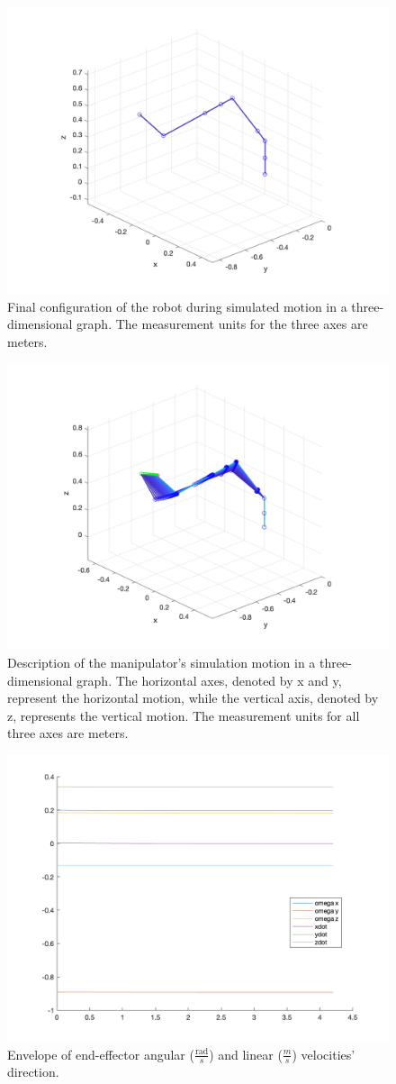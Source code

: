 \begin{figure}
	\centering
	\includegraphics[width=0.7\linewidth]{Resources/FinalConfiguration}
	\caption{Final configuration of the robot during simulated motion in a three-dimensional graph. The measurement units for the three axes are meters.}
	\label{fig:finalconfiguration}
\end{figure}
\begin{figure}
	\centering
	\includegraphics[width=0.7\linewidth]{Resources/MotionOfTheManipulator}
	\caption{ Description of the manipulator’s simulation motion in a three-dimensional graph. The horizontal axes, denoted by x and y, represent the horizontal motion, while the vertical axis, denoted by z, represents the vertical motion. The measurement units for all three axes are meters.}
	\label{fig:motionofthemanipulator}
\end{figure}
\begin{figure}
	\centering
	\includegraphics[width=0.7\linewidth]{Resources/DirectionVelocitiesEE}
	\caption{Envelope of end-effector angular ($\frac{\text{rad}}{s}$) and linear ($\frac{m}{s}$) velocities' direction.}
	\label{fig:directionvelocitiesee}
\end{figure}

